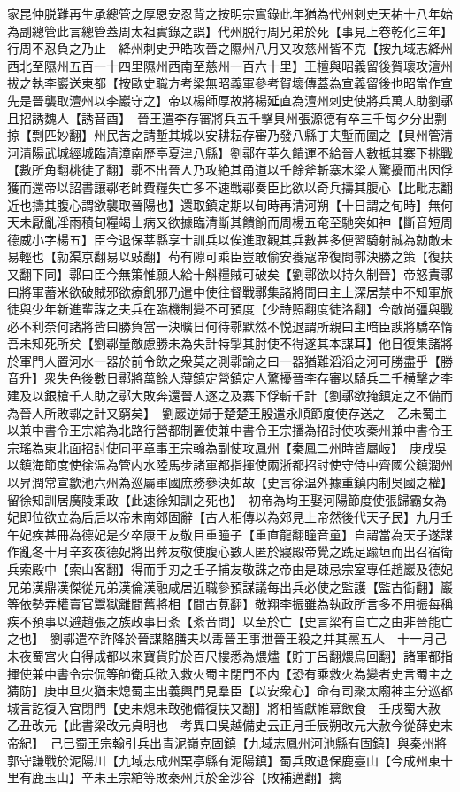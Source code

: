 家昆仲脱難再生承總管之厚恩安忍背之按明宗實錄此年猶為代州刺史天祐十八年始為副總管此言總管蓋周太祖實錄之誤】代州脱行周兄弟於死【事見上卷乾化三年】行周不忍負之乃止　絳州刺史尹皓攻晉之隰州八月又攻慈州皆不克【按九域志絳州西北至隰州五百一十四里隰州西南至慈州一百六十里】王檀與昭義留後賀瓌攻澶州拔之執李巖送東都【按歐史職方考梁無昭義軍參考賀壞傳蓋為宣義留後也昭當作宣先是晉襲取澶州以李巖守之】帝以楊師厚故將楊延直為澶州刺史使將兵萬人助劉鄩且招誘魏人【誘音酉】　晉王遣李存審將兵五千擊貝州張源德有卒三千每夕分出剽掠【剽匹妙翻】州民苦之請塹其城以安耕耘存審乃發八縣丁夫塹而圍之【貝州管清河清陽武城經城臨清漳南歷亭夏津八縣】劉鄩在莘久饋運不給晉人數抵其寨下挑戰【數所角翻桃徒了翻】鄩不出晉人乃攻絶其甬道以千餘斧斬寨木梁人驚擾而出因俘獲而還帝以詔書讓鄩老師費糧失亡多不速戰鄩奏臣比欲以奇兵擣其腹心【比毗志翻近也擣其腹心謂欲襲取晉陽也】還取鎮定期以旬時再清河朔【十日謂之旬時】無何天未厭亂淫雨積旬糧竭士病又欲據臨清斷其饋餉而周楊五奄至馳突如神【斷音短周德威小字楊五】臣今退保莘縣享士訓兵以俟進取觀其兵數甚多便習騎射誠為勍敵未易輕也【勍渠京翻易以䜴翻】苟有隙可乘臣豈敢偷安養寇帝復問鄩決勝之策【復扶又翻下同】鄩曰臣今無策惟願人給十斛糧賊可破矣【劉鄩欲以持久制晉】帝怒責鄩曰將軍蓄米欲破賊邪欲療飢邪乃遣中使往督戰鄩集諸將問曰主上深居禁中不知軍旅徒與少年新進輩謀之夫兵在臨機制變不可預度【少詩照翻度徒洛翻】今敵尚彊與戰必不利奈何諸將皆曰勝負當一決曠日何待鄩默然不悦退謂所親曰主暗臣諛將驕卒惰吾未知死所矣【劉鄩量敵慮勝未為失計特掣其肘使不得遂其本謀耳】他日復集諸將於軍門人置河水一器於前令飲之衆莫之測鄩諭之曰一器猶難滔滔之河可勝盡乎【勝音升】衆失色後數日鄩將萬餘人薄鎮定營鎮定人驚擾晉李存審以騎兵二千横擊之李建及以銀槍千人助之鄩大敗奔還晉人逐之及寨下俘斬千計【劉鄩欲掩鎮定之不備而為晉人所敗鄩之計又窮矣】　劉巖逆婦于楚楚王殷遣永順節度使存送之　乙未蜀主以兼中書令王宗綰為北路行營都制置使兼中書令王宗播為招討使攻秦州兼中書令王宗瑤為東北面招討使同平章事王宗翰為副使攻鳳州【秦鳳二州時皆屬岐】　庚戌吳以鎮海節度使徐温為管内水陸馬步諸軍都指揮使兩浙都招討使守侍中齊國公鎮潤州以昇潤常宣歙池六州為巡屬軍國庶務參決如故【史言徐温外據重鎮内制吳國之權】留徐知訓居廣陵秉政【此速徐知訓之死也】　初帝為均王娶河陽節度使張歸霸女為妃即位欲立為后后以帝未南郊固辭【古人相傳以為郊見上帝然後代天子民】九月壬午妃疾甚冊為德妃是夕卒康王友敬目重瞳子【重直龍翻瞳音童】自謂當為天子遂謀作亂冬十月辛亥夜德妃將出葬友敬使腹心數人匿於寢殿帝覺之跣足踰垣而出召宿衛兵索殿中【索山客翻】得而手刃之壬子捕友敬誅之帝由是疎忌宗室專任趙巖及德妃兄弟漢鼎漢傑從兄弟漢倫漢融咸居近職參預謀議每出兵必使之監護【監古衘翻】巖等依勢弄權賣官鬻獄離間舊將相【間古莧翻】敬翔李振雖為執政所言多不用振每稱疾不預事以避趙張之族政事日紊【紊音問】以至於亡【史言梁有自亡之由非晉能亡之也】　劉鄩遣卒詐降於晉謀賂膳夫以毒晉王事泄晉王殺之并其黨五人　十一月己未夜蜀宫火自得成都以來寶貨貯於百尺樓悉為煨燼【貯丁呂翻煨烏回翻】諸軍都指揮使兼中書令宗侃等帥衛兵欲入救火蜀主閉門不内【恐有乘救火為變者史言蜀主之猜防】庚申旦火猶未熄蜀主出義興門見羣臣【以安衆心】命有司聚太廟神主分巡都城言訖復入宫閉門【史未熄未敢弛備復扶又翻】將相皆獻帷幕飲食　壬戌蜀大赦　乙丑改元【此書梁改元貞明也　考異曰吳越備史云正月壬辰朔改元大赦今從薛史末帝紀】　己巳蜀王宗翰引兵出青泥嶺克固鎮【九域志鳳州河池縣有固鎮】與秦州將郭守謙戰於泥陽川【九域志成州栗亭縣有泥陽鎮】蜀兵敗退保鹿臺山【今成州東十里有鹿玉山】辛未王宗綰等敗秦州兵於金沙谷【敗補邁翻】擒
